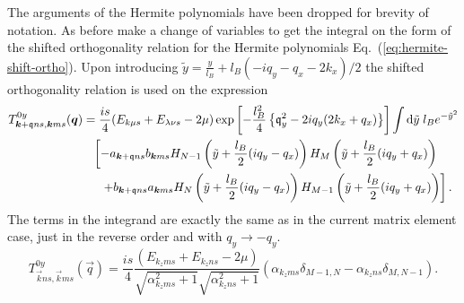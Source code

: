 The arguments of the Hermite polynomials have been dropped for brevity of notation.
As before make a change of variables to get the integral on the form of the shifted orthogonality relation for the Hermite polynomials Eq.~(\ref{eq:hermite-shift-ortho}).
Upon introducing $\tilde{y} = \frac{y}{l_{B}} + l_B( -iq_y - q_x - 2k_x) / 2$ the shifted orthogonality relation is used on the expression
\begin{equation}
  \label{eq:76}
  \begin{split}
    T^{0y}_{\bm{k}+\mathfrak{q}ns, \bm{k}ms} (\bm{q})
    &= \frac{i s}{4}
    (E_{k \mu s} + E_{\lambda \nu s}- 2\mu )
    \exp \left[
      -\frac{l_B^2}{4} \left\{ \mathfrak{q}_y^2- 2 i q_y (2 k_x + q_x) \right\}
    \right]
    \int \mathrm{d}\tilde{y} \; l_B
    e^{-\tilde{y}^2}\\
    &\phantom{=} \left[
      - a_{\bm{k}+\mathfrak{q} ns} b_{\bm{k} ms}
      H_{N-1} \left( \tilde{y} + \frac{l_B}{2} ( iq_y - q_x) \right)
      H_M \left( \tilde{y} + \frac{l_B}{2} (iq_y + q_x) \right)\right.\\
      &\phantom{=\big[} \left.+ b_{\bm{k}+\mathfrak{q} ns} a_{\bm{k}ms}
      H_N \left( \tilde{y} + \frac{l_B}{2} ( iq_y - q_x) \right)
      H_{M-1} \left( \tilde{y} + \frac{l_B}{2} (iq_y + q_x) \right)
    \right].
  \end{split}
\end{equation}
The terms in the integrand are exactly the same as in the current matrix element case, just in the reverse order and with $q_y \to -q_y$.
\begin{equation}
  \label{eq:77}
  T^{0y}_{\vec{k} ns, \vec{k}ms} (\vec{q})
  = \frac{i s}{4}
  \frac{
    (E_{k_z m s} + E_{k_z n s}- 2\mu )
  }{
    \sqrt{\alpha_{k_zms}^2 +1}
    \sqrt{\alpha_{k_zns}^2 + 1}
  }
  \left(
    \alpha_{k_z m s}
    \delta_{M-1, N}
    -
    \alpha_{k_z n s}
    \delta_{M, N-1}
  \right).
\end{equation}

